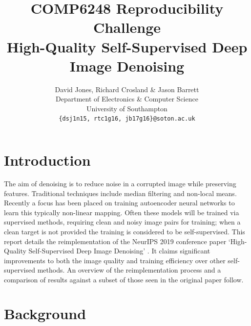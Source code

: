 \documentclass{article} %
\title{COMP6248 Reproducibility Challenge\\
{\Large High-Quality Self-Supervised Deep Image Denoising}}
\author{David Jones, Richard Crosland \& Jason Barrett \\
Department of Electronics \& Computer Science  \\
University of Southampton \\
\texttt{\{dsj1n15, rtc1g16, jb17g16\}@soton.ac.uk}
}
\begin{document}
\maketitle


\section{Introduction}
The aim of denoising is to reduce noise in a corrupted image while preserving features. Traditional techniques include median filtering and non-local means. Recently a focus has been placed on training autoencoder neural networks to learn this typically non-linear mapping. Often these models will be trained via supervised methods, requiring clean and noisy image pairs for training; when a clean target is not provided the training is considered to be self-supervised. This report details the reimplementation of the NeurIPS 2019 conference paper `High-Quality Self-Supervised Deep Image Denoising' \citep{ssdn}. It claims significant improvements to both the image quality and training efficiency over other self-supervised methods. An overview of the reimplementation process and a comparison of results against a subset of those seen in the original paper follow.

\section{Background}
\end{document}
